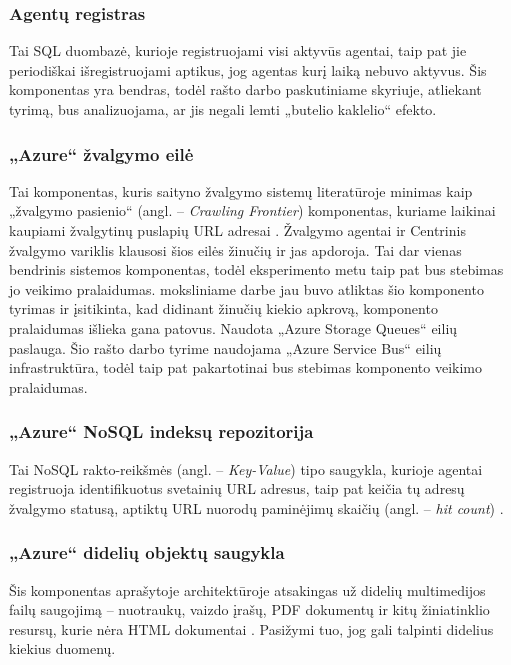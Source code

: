  \subsubsection{Agentų registras}
 
 Tai SQL duombazė, kurioje registruojami visi aktyvūs agentai, taip pat jie periodiškai išregistruojami aptikus, jog agentas kurį laiką nebuvo aktyvus. Šis komponentas yra bendras, todėl rašto darbo paskutiniame skyriuje, atliekant tyrimą, bus analizuojama, ar jis negali lemti „butelio kaklelio“ efekto.
 
 \subsubsection{„Azure“ žvalgymo eilė}
 
 Tai komponentas, kuris saityno žvalgymo sistemų literatūroje minimas kaip „žvalgymo pasienio“ (angl. -- \textit{Crawling Frontier}) komponentas, kuriame laikinai kaupiami žvalgytinų puslapių URL adresai \cite{EffectiveWebCrawling}. Žvalgymo agentai ir Centrinis žvalgymo variklis klausosi šios eilės žinučių ir jas apdoroja. Tai dar vienas bendrinis sistemos komponentas, todėl eksperimento metu taip pat bus stebimas jo veikimo pralaidumas. \cite{MercedCloudBasedWebCrawler} moksliniame darbe jau buvo atliktas šio komponento tyrimas ir įsitikinta, kad didinant žinučių kiekio apkrovą, komponento pralaidumas išlieka gana patovus. Naudota „Azure Storage Queues“ eilių paslauga. Šio rašto darbo tyrime naudojama „Azure Service Bus“ eilių infrastruktūra, todėl taip pat pakartotinai bus stebimas komponento veikimo pralaidumas.
 
 \subsubsection{„Azure“ NoSQL indeksų repozitorija}

Tai NoSQL rakto-reikšmės (angl. -- \textit{Key-Value}) tipo saugykla, kurioje agentai registruoja identifikuotus svetainių URL adresus, taip pat keičia tų adresų žvalgymo statusą, aptiktų URL nuorodų paminėjimų skaičių (angl. -- \textit{hit count}) \cite{MercedCloudBasedWebCrawler}.

\subsubsection{„Azure“ didelių objektų saugykla}

Šis komponentas aprašytoje architektūroje atsakingas už didelių multimedijos failų saugojimą -- nuotraukų, vaizdo įrašų, PDF dokumentų ir kitų žiniatinklio resursų, kurie nėra HTML dokumentai \cite{MercedCloudBasedWebCrawler}. Pasižymi tuo, jog gali talpinti didelius kiekius duomenų.

